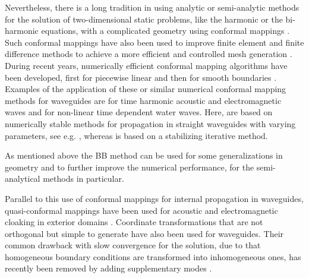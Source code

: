 \documentclass[numreferences]{kluwer}
\begin{document}
Nevertheless, there is a long tradition in using analytic or
semi-analytic methods for the solution of two-dimensional static
problems, like the harmonic or the bi-harmonic equations, with a
complicated geometry using conformal mappings
\cite{muskhelishvili:1962}. Such conformal mappings have also been
used to improve finite element and finite difference methods to
achieve a more efficient and controlled mesh generation
\cite{ives+liutermoza:1977}. During recent years, numerically
efficient conformal mapping algorithms have been developed, first for
piecewise linear \cite{sctoolbox} and then for smooth boundaries
\cite{andersson-outpol:2008,andersson-acf:2009}. Examples of the
application of these or similar numerical conformal mapping methods
for waveguides are \cite{Andersson:2006,Andersson-Nilsson:2009} for
time harmonic acoustic and electromagnetic waves and
\cite{nachbin+daSilvaSimoes:2012} for non-linear time dependent water
waves. Here, \cite{Andersson:2006,Andersson-Nilsson:2009} are based on
numerically stable methods for propagation in straight waveguides with
varying parameters, see e.g. \cite{Fishman:1998,Nilsson:2002}, whereas
\cite{nachbin+daSilvaSimoes:2012} is based on a stabilizing iterative
method.

As mentioned above the BB method can be used for some generalizations
in geometry and to further improve the numerical performance, for the
semi-analytical methods in particular.

Parallel to this use of conformal mappings for internal propagation in
waveguides, quasi-conformal mappings have been used for acoustic and
electromagnetic cloaking in exterior domains
\cite{pendryschurigsmith2006}. Coordinate transformations that are not
orthogonal but simple to generate have also been used for
waveguides. Their common drawback with slow convergence for the
solution, due to that homogeneous boundary conditions are transformed
into inhomogeneous ones, has recently been removed by adding
supplementary modes \cite{maurel+mercier+felix:2014}.
\end{document}

